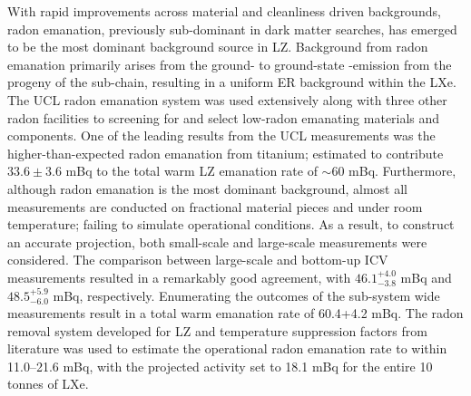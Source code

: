 With rapid improvements across material and cleanliness driven backgrounds, radon emanation, previously sub-dominant in dark matter searches, has emerged to be the most dominant background source in LZ. Background from radon emanation primarily arises from the ground- to ground-state \beta{}-emission from the \PbTOF{} progeny of the \RnTTT{} sub-chain, resulting in a uniform ER background within the LXe. The UCL radon emanation system was used extensively along with three other radon facilities to screening for and select low-radon emanating materials and components. One of the leading results from the UCL measurements was the higher-than-expected radon emanation from titanium; estimated to contribute $33.6\pm3.6$ mBq to the total warm LZ emanation rate of $\sim60$ mBq. Furthermore, although radon emanation is the most dominant background, almost all measurements are conducted on fractional material pieces and under room temperature; failing to simulate operational conditions. As a result, to construct an accurate projection, both small-scale and large-scale measurements were considered. The comparison between large-scale and bottom-up ICV measurements resulted in a remarkably good agreement, with $46.1^{+4.0}_{-3.8}$ mBq and $48.5^{+5.9}_{-6.0}$ mBq, respectively. Enumerating the outcomes of the sub-system wide measurements result in a total warm emanation rate of 60.4+4.2 mBq. The radon removal system developed for LZ and temperature suppression factors from literature was used to estimate the operational radon emanation rate to within 11.0--21.6 mBq, with the projected activity set to 18.1 mBq for the entire 10 tonnes of LXe. 

